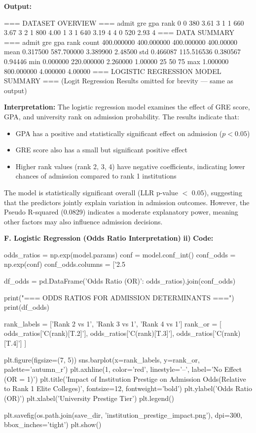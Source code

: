 \documentclass[12pt,a4paper]{article}
\begin{document}
\textbf{Output:}
\begin{codebox}
=== DATASET OVERVIEW ===
admit gre gpa rank
0 0 380 3.61 3
1 1 660 3.67 3
2 1 800 4.00 1
3 1 640 3.19 4
4 0 520 2.93 4
=== DATA SUMMARY ===
admit gre gpa rank
count 400.000000 400.000000 400.000000 400.00000
mean 0.317500 587.700000 3.389900 2.48500
std 0.466087 115.516536 0.380567 0.94446
min 0.000000 220.000000 2.260000 1.00000
25%
50%
75%
max 1.000000 800.000000 4.000000 4.00000
=== LOGISTIC REGRESSION MODEL SUMMARY ===
(Logit Regression Results omitted for brevity — same as output)
\end{codebox}

\textbf{Interpretation:}
The logistic regression model examines the effect of GRE score, GPA, and university rank on admission probability.
The results indicate that:
\begin{itemize}
\item GPA has a positive and statistically significant effect on admission ($p < 0.05$)
\item GRE score also has a small but significant positive effect
\item Higher rank values (rank 2, 3, 4) have negative coefficients, indicating lower chances of admission compared to rank 1 institutions
\end{itemize}
The model is statistically significant overall (LLR p-value $<$ 0.05), suggesting that the predictors jointly explain variation in admission outcomes.
However, the Pseudo R-squared (0.0829) indicates a moderate explanatory power, meaning other factors may also influence admission decisions.

\textbf{F. Logistic Regression (Odds Ratio Interpretation)}
\textbf{ii)}
\textbf{Code:}
\begin{codebox}

odds_ratios = np.exp(model.params)
conf = model.conf_int()
conf_odds = np.exp(conf)
conf_odds.columns = ['2.5%


df_odds = pd.DataFrame({'Odds Ratio (OR)':
odds_ratios}).join(conf_odds)

print("=== ODDS RATIOS FOR ADMISSION DETERMINANTS ===")
print(df_odds)


rank_labels = ['Rank 2 vs 1', 'Rank 3 vs 1', 'Rank 4 vs 1']
rank_or = [
    odds_ratios['C(rank)[T.2]'],
    odds_ratios['C(rank)[T.3]'],
    odds_ratios['C(rank)[T.4]']
]

plt.figure(figsize=(7, 5))
sns.barplot(x=rank_labels, y=rank_or, palette='autumn_r')
plt.axhline(1, color='red', linestyle='--',
label='No Effect (OR = 1)')
plt.title('Impact of Institution Prestige
on Admission Odds\n(Relative to Rank 1 Elite Colleges)',
fontsize=12, fontweight='bold')
plt.ylabel('Odds Ratio (OR)')
plt.xlabel('University Prestige Tier')
plt.legend()


plt.savefig(os.path.join(save_dir, 
'institution_prestige_impact.png'),
dpi=300, bbox_inches='tight')
plt.show()
\end{codebox}
\end{document}
